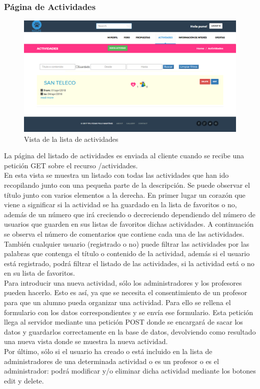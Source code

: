 \subsubsection{Página de Actividades}
\label{subsubsec:actividades}
\begin{figure}[H]
\centering
\includegraphics[width=12cm]{img/actividades}
\caption{Vista de la lista de actividades}
\label{figura:actividades}
\end{figure}
La página del listado de actividades es enviada al cliente cuando se recibe una petición GET sobre el recurso /actividades.\\
En esta vista se muestra un listado con todas las actividades que han ido recopilando junto con una pequeña parte de la descripción. Se puede observar el título junto con varios elementos a la derecha. En primer lugar un corazón que viene a significar si la actividad se ha guardado en la lista de favoritos o no, además de un número que irá creciendo o decreciendo dependiendo del número de usuarios que guarden en sus listas de favoritos dichas actividades. A continuación se observa el número de comentarios que contiene cada una de las actividades.\\
También cualquier usuario (registrado o no) puede filtrar las actividades por las palabras que contenga el título o contenido de la actividad, además si el usuario está registrado, podrá filtrar el listado de las actividades, si la actividad está o no en su lista de favoritos.\\
Para introducir una nueva actividad, sólo los administradores y los profesores pueden hacerlo. Esto es así, ya que se necesita el consentimiento de un profesor para que un alumno pueda organizar una actividad. Para ello se rellena el formulario con los datos correspondientes y se envía ese formulario. Esta petición llega al servidor mediante una petición POST donde se encargará de sacar los datos y guardarlos correctamente en la base de datos, devolviendo como resultado una nueva vista donde se muestra la nueva actividad.\\
Por último, sólo si el usuario ha creado o está incluido en la lista de administradores de una determinada actividad o es un profesor o es el administrador: podrá modificar y/o eliminar dicha actividad mediante los botones edit y delete.

